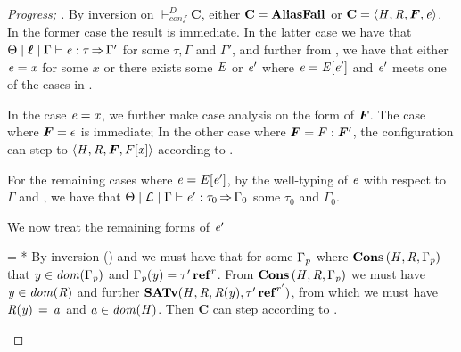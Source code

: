 \begin{proof}[Progress; ]
  By inversion on $ \vdash_{\mathit{conf} }^D  \mathbf{C} $, either $\mathbf{C}  =   \mathbf{AliasFail} $ or $\mathbf{C}  \ottsym{=}   \tuple{ \ottnt{H} ,  \ottnt{R} ,  \oldvec{F} ,  \ottnt{e} } $.
  In the former case the result is immediate. In the latter case we have
  that $ \Theta   \mid   \oldvec{\ell}   \mid   \Gamma   \vdash   \ottnt{e}  :  \tau   \produces   \Gamma' $ for some $\tau, \Gamma$ and $\Gamma'$,
  and further from   , we have that either $\mathit{e}  =  \mathit{x}$ for some $\mathit{x}$ or there exists
  some $\mathit{E}$ or $\mathit{e'}$ where $\mathit{e}  =  \mathit{E}  [  \mathit{e'}  ]$ and $\mathit{e'}$ meets one of the cases in
  .

  In the case $\mathit{e}  =  \mathit{x}$, we further make case analysis on the form of $\oldvec{F}$.
  The case where $\oldvec{F}  \ottsym{=}   \epsilon $ is immediate;
  In the other case where $\oldvec{F}  \ottsym{=}  F  \ottsym{:}  \oldvec{F}'$, the configuration can step
  to $ \tuple{ \ottnt{H} ,  \ottnt{R} ,  \oldvec{F} ,  F  \ottsym{[}  \mathit{x}  \ottsym{]} } $ according to .
  
  For the remaining cases where $\mathit{e}  =  \mathit{E}  [  \mathit{e'}  ]$,
  by the well-typing of $\mathit{e}$ with respect to $\Gamma$ and ,
  we have that $ \Theta   \mid   \mathcal{L}   \mid   \Gamma   \vdash   \mathit{e'}  :  \tau_{{\mathrm{0}}}   \operatorname{\Rightarrow}   \Gamma_{{\mathrm{0}}} $ some $\tau_{{\mathrm{0}}}$ and $\Gamma_{{\mathrm{0}}}$.

  We now treat the remaining forms of $\mathit{e'}$
  \begin{eqncase}{
        \ottsym{=}   \LET  {}  =   *     \IN  {} 
    }
    By inversion () and  we must have
    that for some $\Gamma_{\mathit{p}}$ where $\mathbf{Cons} \, (  \mathit{H}  ,  \mathit{R}  ,  \Gamma_{\mathit{p}}  )$ that $ \mathit{y}  \in   \mathit{dom}( \Gamma_{\mathit{p}} )  $ and
    $\Gamma_{\mathit{p}}  (  \mathit{y}  )  =   \tau'  \operatorname{\mathbf{ref}}^{ r } $. From $\mathbf{Cons} \, (  \mathit{H}  ,  \mathit{R}  ,  \Gamma_{\mathit{p}}  )$ we must have $ \mathit{y}  \in   \mathit{dom}( \mathit{R} )  $
    and further $ \mathbf{SATv} ( \mathit{H} , \mathit{R} , \mathit{R}  (  \mathit{y}  ) ,  \tau'  \operatorname{\mathbf{ref}}^{ r' }  ) $, from which we must have
    $\mathit{R}  (  \mathit{y}  ) \, = \, \mathit{a}$ and  $ \mathit{a}  \in   \mathit{dom}( \mathit{H} )  $. Then $\mathbf{C}$ can step according to .
  \end{eqncase}
  

\end{proof}
